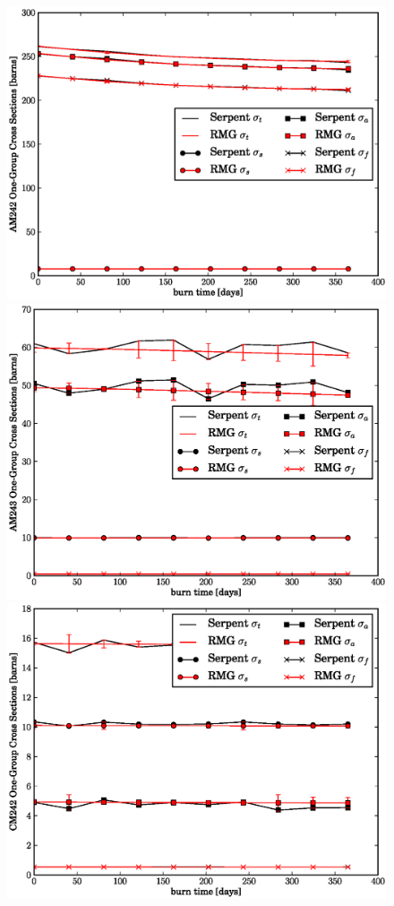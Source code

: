 \begin{figure}[htbp]
\begin{center}
\includegraphics[scale=0.3]{multigroup_method/figs/benchmark/AM242_1g_xs.eps}
\includegraphics[scale=0.3]{multigroup_method/figs/benchmark/AM243_1g_xs.eps}
\includegraphics[scale=0.3]{multigroup_method/figs/benchmark/CM242_1g_xs.eps}

\end{center}
\end{figure}
